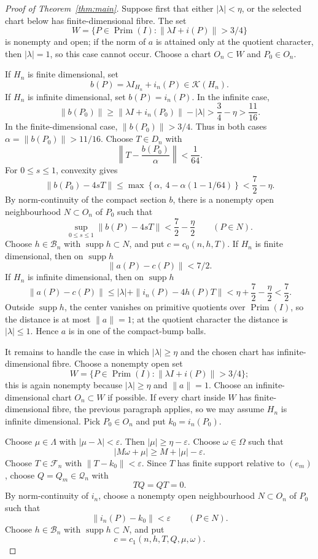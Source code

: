 \documentclass[11pt]{article}
\newcommand{\Kcal}{\mathcal K}
\newcommand{\Prim}{\operatorname{Prim}}
\newcommand{\supp}{\operatorname{supp}}
\begin{document}
\begin{proof}[Proof of Theorem~\ref{thm:main}]
Suppose first that either \(|\lambda|<\eta\), or the selected chart below has
finite-dimensional fibre.  The set
\[
        W=\{P\in\Prim(I):\|\lambda I+i(P)\|>3/4\}
\]
is nonempty and open; if the norm of \(a\) is attained only at the quotient
character, then \(|\lambda|=1\), so this case cannot occur.  Choose a chart
\(O_n\subset W\) and \(P_0\in O_n\).

If \(H_n\) is finite dimensional, set
\[
        b(P)=\lambda I_{H_n}+i_n(P)\in \Kcal(H_n).
\]
If \(H_n\) is infinite dimensional, set \(b(P)=i_n(P)\).  In the infinite
case,
\[
        \|b(P_0)\|\ge \|\lambda I+i_n(P_0)\|-|\lambda|
        >\frac34-\eta>\frac{11}{16}.
\]
In the finite-dimensional case, \(\|b(P_0)\|>3/4\).  Thus in both cases
\(\alpha=\|b(P_0)\|>11/16\).  Choose \(T\in D_n\) with
\[
        \left\|T-\frac{b(P_0)}{\alpha}\right\|<\frac1{64}.
\]
For \(0\le s\le1\), convexity gives
\[
        \|b(P_0)-4sT\|
        \le
        \max\left\{\alpha,\ 4-\alpha(1-1/64)\right\}
        <\frac72-\eta.
\]
By norm-continuity of the compact section \(b\), there is a nonempty open
neighbourhood \(N\subset O_n\) of \(P_0\) such that
\[
        \sup_{0\le s\le1}\|b(P)-4sT\|<\frac72-\frac{\eta}{2}
        \qquad(P\in N).
\]
Choose \(h\in\mathcal B_n\) with \(\supp h\subset N\), and put
\(c=c_0(n,h,T)\).  If \(H_n\) is finite dimensional, then on \(\supp h\)
\[
        \|a(P)-c(P)\|<7/2.
\]
If \(H_n\) is infinite dimensional, then on \(\supp h\)
\[
        \|a(P)-c(P)\|
        \le |\lambda|+\|i_n(P)-4h(P)T\|
        <\eta+\frac72-\frac{\eta}{2}<\frac72.
\]
Outside \(\supp h\), the center vanishes on primitive quotients over
\(\Prim(I)\), so the distance is at most \(\|a\|=1\); at the quotient
character the distance is \(|\lambda|\le1\).  Hence \(a\) is in one of the
compact-bump balls.

It remains to handle the case in which \(|\lambda|\ge\eta\) and the chosen
chart has infinite-dimensional fibre.  Choose a nonempty open set
\[
        W=\{P\in\Prim(I):\|\lambda I+i(P)\|>3/4\};
\]
this is again nonempty because \(|\lambda|\ge\eta\) and \(\|a\|=1\).  Choose
an infinite-dimensional chart \(O_n\subset W\) if possible.  If every chart
inside \(W\) has finite-dimensional fibre, the previous paragraph applies, so
we may assume \(H_n\) is infinite dimensional.  Pick \(P_0\in O_n\) and put
\(k_0=i_n(P_0)\).

Choose \(\mu\in\Lambda\) with \(|\mu-\lambda|<\varepsilon\).  Then
\(|\mu|\ge\eta-\varepsilon\).  Choose \(\omega\in\Omega\) such that
\[
        |M\omega+\mu|\ge M+|\mu|-\varepsilon.
\]
Choose \(T\in\mathcal F_n\) with \(\|T-k_0\|<\varepsilon\).  Since \(T\) has
finite support relative to \((e_m)\), choose \(Q=Q_m\in\mathcal Q_n\) with
\[
        TQ=QT=0.
\]
By norm-continuity of \(i_n\), choose a nonempty open neighbourhood
\(N\subset O_n\) of \(P_0\) such that
\[
        \|i_n(P)-k_0\|<\varepsilon\qquad(P\in N).
\]
Choose \(h\in\mathcal B_n\) with \(\supp h\subset N\), and put
\[
        c=c_1(n,h,T,Q,\mu,\omega).
\]


\end{proof}
\end{document}
